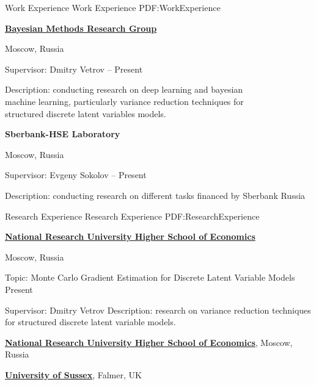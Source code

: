 \documentclass[letterpaper,MMMyyyy,nonstopmode]{simpleresumecv}
\begin{document}
\begin{Body}

\Section
{Work Experience}
{Work Experience}
{PDF:WorkExperience}

\Entry
\href{http://bayesgroup.ru}
{\textbf{Bayesian Methods Research Group}}
\par
Moscow, Russia

\Gap
\BulletItem
Supervisor: Dmitry Vetrov
\hfill
{} --
Present
\begin{Detail}
\SubBulletItem
Description: conducting research on deep learning and bayesian\\ machine learning, particularly variance reduction techniques for\\ structured discrete latent variables models. 
\end{Detail}

\Gap

\Entry
\textbf{Sberbank-HSE Laboratory}
\par
Moscow, Russia

\Gap
\BulletItem
Supervisor: Evgeny Sokolov
\hfill
{} --
Present
\begin{Detail}
\SubBulletItem
Description: conducting research on different tasks financed by Sberbank Russia
\end{Detail}


\Section
{Research Experience}
{Research Experience}
{PDF:ResearchExperience}

\Entry
\href{https://www.hse.ru/en/}
{\textbf{National Research University Higher School of Economics}}
\par
Moscow, Russia

\Gap
\BulletItem
Topic: Monte Carlo Gradient Estimation for Discrete Latent Variable Models
\hfill
Present
\begin{Detail}
\SubBulletItem
Supervisor:
Dmitry Vetrov
\SubBulletItem
Description: research on variance reduction techniques
\newline
for structured discrete latent variable models.
\end{Detail}

\Entry
\href{https://www.hse.ru/en/}
{\textbf{National Research University Higher School of Economics}}, Moscow, Russia
\par
\href{https://www.sussex.ac.uk}
{\textbf{University of Sussex}}, Falmer, UK


\end{Body}
\end{document}
